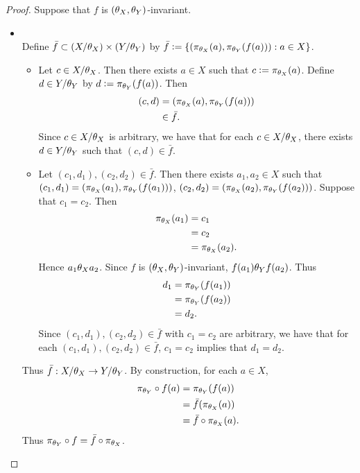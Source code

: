 \begin{proof}
	Suppose that $f$ is $(\theta_X, \theta_Y)$-invariant. 
	\begin{itemize}
		\item {} \\
		Define $\bar{f} \subset (X/\theta_X) \times (Y/\theta_Y)$ by $\bar{f} \vcentcolon= \{(\pi_{\theta_X}(a), \pi_{\theta_Y}(f(a))): a \in X\}$. 
		\begin{itemize}
			\item Let $c \in X/\theta_X$. Then there exists $a \in X$ such that $c \vcentcolon= \pi_{\theta_X}(a)$. Define $d \in Y/\theta_Y$ by $d \vcentcolon= \pi_{\theta_Y}(f(a))$. Then 
			\begin{align*}
				(c,d)
				& = (\pi_{\theta_X}(a), \pi_{\theta_Y}(f(a))) \\
				& \in \bar{f}.
			\end{align*}
			Since $c \in X/\theta_X$ is arbitrary, we have that for each $c \in X/\theta_X$, there exists $d \in Y/\theta_Y$ such that $(c,d) \in \bar{f}$. 
			\item Let $(c_1, d_1), (c_2, d_2) \in \bar{f}$. Then there exists $a_1,a_2 \in X$ such that $(c_1, d_1) = (\pi_{\theta_X}(a_1), \pi_{\theta_Y}(f(a_1)))$, $(c_2, d_2) = (\pi_{\theta_X}(a_2), \pi_{\theta_Y}(f(a_2)))$. Suppose that $c_1 = c_2$. Then 
			\begin{align*}
				\pi_{\theta_X}(a_1)
				& = c_1 \\
				& = c_2 \\
				& = \pi_{\theta_X}(a_2).
			\end{align*}
			Hence $a_1 \theta_X a_2$. Since $f$ is $(\theta_X, \theta_Y)$-invariant, $f(a_1) \theta_Y f(a_2)$. Thus 
			\begin{align*}
				d_1
				& = \pi_{\theta_Y}(f(a_1)) \\
				& = \pi_{\theta_Y}(f(a_2)) \\
				& = d_2. 
			\end{align*}
			Since $(c_1, d_1), (c_2, d_2) \in \bar{f}$ with $c_1 = c_2$ are arbitrary, we have that for each $(c_1, d_1), (c_2, d_2) \in \bar{f}$, $c_1 = c_2$ implies that $d_1 = d_2$.
		\end{itemize}
		Thus $\bar{f}:X/\theta_X \rightarrow Y/\theta_Y$. By construction, for each $a \in X$, 
		\begin{align*}
			\pi_{\theta_Y} \circ f(a) 
			& = \pi_{\theta_Y}(f(a)) \\
			& = \bar{f}(\pi_{\theta_X}(a)) \\
			& = \bar{f} \circ \pi_{\theta_X}(a).
		\end{align*}
		Thus $\pi_{\theta_Y} \circ f = \bar{f} \circ \pi_{\theta_X}$. 

\end{itemize}
\end{proof}
